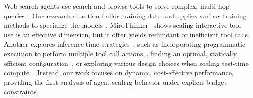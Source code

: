 Web search agents use search and browse tools to solve complex, multi-hop queries~\citep{DBLP:journals/corr/abs-2508-06600,DBLP:journals/corr/abs-2508-07999,team2025kimi,DBLP:journals/corr/abs-2507-16075,DBLP:journals/corr/abs-2510-24701}. 
One research direction builds training data and applies various training methods to specialize the models~\citep{DBLP:journals/corr/abs-2503-09516,DBLP:journals/corr/abs-2505-22648,DBLP:journals/corr/abs-2507-02592,Liu2025WebExplorerEA,DBLP:journals/corr/abs-2507-15061,DBLP:journals/corr/abs-2510-24699,DBLP:journals/corr/abs-2508-13167}.
MiroThinker~\citep{miromindteam2025mirothinkerpushingperformanceboundaries} shows scaling interactive tool use is an effective dimension, but it often yields redundant or inefficient tool calls.
Another explores inference-time strategies~\citep{DBLP:journals/corr/abs-2501-05366,DBLP:journals/corr/abs-2506-15741,Qiao2025WebResearcherUU,DBLP:journals/corr/abs-2509-25301}, such as incorporating programmatic execution to perform multiple tool call actions~\citep{DBLP:journals/corr/abs-2508-09129}, finding an optimal, statically efficient configuration~\citep{DBLP:journals/corr/abs-2508-02694}, or exploring various design choices when scaling test-time compute~\citep{DBLP:journals/corr/abs-2506-12928}. Instead, our work focuses on dynamic, cost-effective performance, providing the first analysis of agent scaling behavior under explicit budget constraints.
